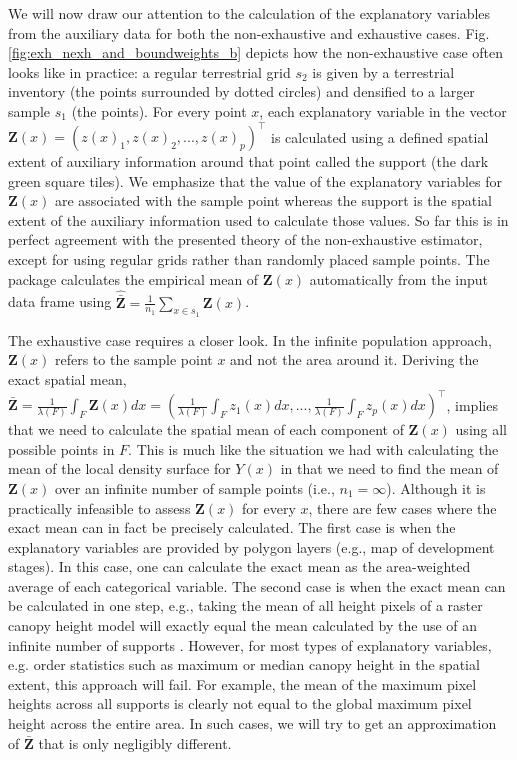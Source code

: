 \documentclass[article]{jss}
\begin{document}
We will now draw our attention to the calculation of the explanatory variables from the auxiliary data for both the non-exhaustive and exhaustive cases. Fig. \ref{fig:exh_nexh_and_boundweights_b} depicts how the non-exhaustive case often looks like in practice: a regular terrestrial grid $s_2$ is given by a terrestrial inventory (the points surrounded by dotted circles) and densified to a larger sample $s_1$ (the points). For every point $x$, each explanatory variable in the vector $\pmb{Z}(x)=(z(x)_1, z(x)_2,...,z(x)_p)^{\top}$ is calculated using a defined spatial extent of auxiliary information around that point called the support (the dark green square tiles). We emphasize that the value of the explanatory variables for $\pmb{Z}(x)$ are associated with the sample point whereas the support is the spatial extent of the auxiliary information used to calculate those values. So far this is in perfect agreement with the presented theory of the non-exhaustive estimator, except for using regular grids rather than randomly placed sample points. The  package calculates the empirical mean of $\pmb{Z}(x)$ automatically from the input data frame using $\hat{\bar{\pmb{Z}}}=\frac{1}{n_{1}}\sum_{x\in{s_{1}}}\pmb{Z}(x)$.\par

The exhaustive case requires a closer look. In the infinite population approach, $\pmb{Z}(x)$ refers to the sample point $x$ and not the area around it. Deriving the exact spatial mean, $\bar{\pmb{Z}}=\frac{1}{\lambda(F)}\int_{F} \pmb{Z}(x)dx= (\frac{1}{\lambda(F)}\int_{F} z_1(x)dx, ..., \frac{1}{\lambda(F)}\int_{F} z_p(x)dx)^{\top}$, implies that we need to calculate the spatial mean of each component of $\pmb{Z}(x)$ using all possible points in $F$. This is much like the situation we had with calculating the mean of the local density surface for $Y(x)$ in that we need to find the mean of $\pmb{Z}(x)$ over an infinite number of sample points (i.e., $n_1=\infty$). Although it is practically infeasible to assess $\pmb{Z}(x)$ for every $x$, there are few cases where the exact mean can in fact be precisely calculated. The first case is when the explanatory variables are provided by polygon layers (e.g., map of development stages). In this case, one can calculate the exact mean as the area-weighted average of each categorical variable. The second case is when the exact mean can be calculated in one step, e.g., taking the mean of all height pixels of a raster canopy height model will exactly equal the mean calculated by the use of an infinite number of supports \citep{mandallaz2013b}. However, for most types of explanatory variables, e.g. order statistics such as maximum or median canopy height in the spatial extent, this approach will fail.  For example, the mean of the maximum pixel heights across all supports is clearly not equal to the global maximum pixel height across the entire area.  In such cases, we will try to get an approximation of $\bar{\pmb{Z}}$ that is only negligibly different. \par
\end{document}
